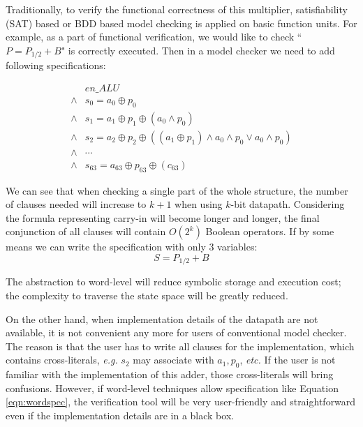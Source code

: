 \begin{Example}
\vspace{0.2in}

Traditionally, to verify the functional correctness of this multiplier, satisfiability (SAT) based or BDD based 
model checking is applied on basic function units. For example, as a part of functional verification, 
we would like to check ``$P=P_{1/2}+B$" is correctly executed. Then in a model checker we need to add following 
specifications:

\begin{align*}
& en\_ALU \\
\land & s_0 = a_0 \oplus p_0 \\
\land & s_1 = a_1 \oplus p_1 \oplus (a_0 \land p_0) \\
\land & s_2 = a_2 \oplus p_2 \oplus ((a_1 \oplus p_1) \land a_0 \land p_0 \lor a_0 \land p_0) \\
\land & \cdots \\
\land & s_{63} = a_{63} \oplus p_{63} \oplus (c_{63})
\end{align*}

We can see that when checking a single part of the whole structure, the number of clauses 
needed will increase to $k+1$ when using $k$-bit datapath. Considering the formula representing 
carry-in will become longer and longer, the final conjunction of all clauses will contain 
$O(2^k)$ Boolean operators. If by some means we can write the specification with only 3 variables:
\begin{equation}
\label{eqn:wordspec}
S=P_{1/2}+B
\end{equation}

The abstraction to word-level will reduce symbolic storage and execution cost; the complexity 
to traverse the state space will be greatly reduced.
\end{Example}

On the other hand, when implementation details of the datapath are not available, it is not convenient 
any more for users of conventional model checker. The reason is that the user has to write all clauses 
for the implementation, which contains cross-literals, {\it e.g.} $s_2$ may associate with $a_1, p_0$, {\it etc.} If the user 
is not familiar with the implementation of this adder, those cross-literals will bring
confusions. However, if word-level techniques allow specification like Equation \ref{eqn:wordspec},
the verification tool will be very user-friendly and straightforward even if the implementation details
are in a black box.

